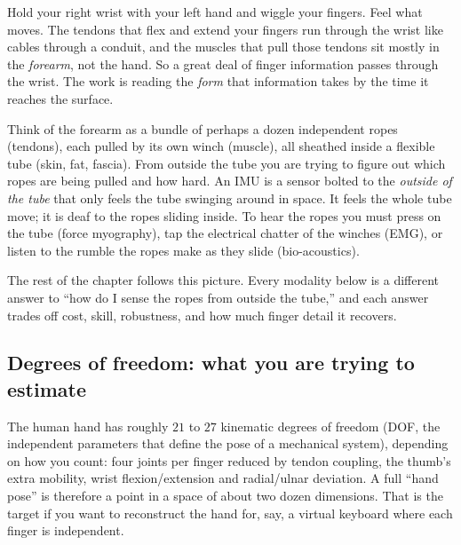 Hold your right wrist with your left hand and wiggle your fingers. Feel what moves.
The tendons that flex and extend your fingers run through the wrist like cables
through a conduit, and the muscles that pull those tendons sit mostly in the
\emph{forearm}, not the hand. So a great deal of finger information passes through the wrist. The work is reading the
\emph{form} that information takes by the time it reaches the surface.

\begin{intuitionbox}
Think of the forearm as a bundle of perhaps a dozen independent ropes (tendons),
each pulled by its own winch (muscle), all sheathed inside a flexible tube (skin,
fat, fascia). From outside the tube you are trying to figure out which ropes are
being pulled and how hard. An IMU is a sensor bolted to the \emph{outside of the
tube} that only feels the tube swinging around in space. It feels the whole tube
move; it is deaf to the ropes sliding inside. To hear the ropes you must press on
the tube (force myography), tap the electrical chatter of the winches (EMG), or
listen to the rumble the ropes make as they slide (bio-acoustics).
\end{intuitionbox}

The rest of the chapter follows this picture. Every modality below is a different
answer to ``how do I sense the ropes from outside the tube,'' and each answer trades
off cost, skill, robustness, and how much finger detail it recovers.

\subsection{Degrees of freedom: what you are trying to estimate}
\label{ch37:dof}

The human hand has roughly $21$ to $27$ kinematic degrees of freedom (DOF, the independent parameters that define the pose of a mechanical system),
depending on how you count: four joints per finger reduced by tendon coupling, the
thumb's extra mobility, wrist flexion/extension and radial/ulnar deviation. A full
``hand pose'' is therefore a point in a space of about two dozen dimensions. That is
the target if you want to reconstruct the hand for, say, a virtual keyboard where
each finger is independent.

